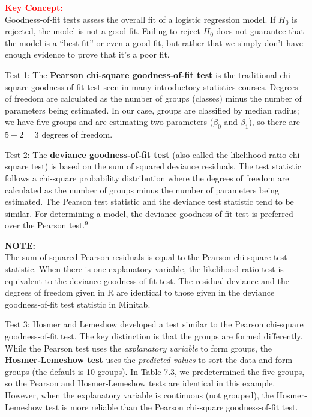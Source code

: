 \documentclass[
]{report}
\begin{document}
\large

\textbf{\textcolor{red}{Key Concept:}}\\
\color{red}
Goodness‐of‐fit tests assess the overall fit of a logistic regression model. If \(H_0\) is rejected, the model is not a good fit. Failing to reject \(H_0\) does not guarantee that the model is a ``best fit'' or even a good fit, but rather that we simply don't have enough evidence to prove that it's a poor fit.\\
\color{black}
\normalsize

Test 1: The \textbf{Pearson chi‐square goodness‐of‐fit test} is the traditional chi‐square goodness‐of‐fit test seen in many introductory statistics courses. Degrees of freedom are calculated as the number of groups (classes) minus the number of parameters being estimated. In our case, groups are classified by median radius; we have five groups and are estimating two parameters (\(\beta_0\) and \(\beta_1\)), so there are \(5 - 2 = 3\) degrees of freedom.

Test 2: The \textbf{deviance goodness‐of‐fit test} (also called the likelihood ratio chi‐square test) is based on the sum of squared deviance residuals. The test statistic follows a chi‐square probability distribution where the degrees of freedom are calculated as the number of groups minus the number of parameters being estimated. The Pearson test statistic and the deviance test statistic tend to be similar. For determining a model, the deviance goodness‐of‐fit test is preferred over the Pearson test.\(^9\)

\large

\textbf{NOTE:}\\
The sum of squared Pearson residuals is equal to the Pearson chi‐square test statistic. When there is one explanatory variable, the likelihood ratio test is equivalent to the deviance goodness‐of‐fit test. The residual deviance and the degrees of freedom given in R are identical to those given in the deviance goodness‐of‐fit test statistic in Minitab.\\
\normalsize

Test 3: Hosmer and Lemeshow developed a test similar to the Pearson chi‐square goodness‐of‐fit test. The key distinction is that the groups are formed differently. While the Pearson test uses the \emph{explanatory variable} to form groups, the \textbf{Hosmer‐Lemeshow test} uses the \emph{predicted values} to sort the data and form groups (the default is 10 groups). In Table 7.3, we predetermined the five groups, so the Pearson and Hosmer‐Lemeshow tests are identical in this example. However, when the explanatory variable is continuous (not grouped), the Hosmer‐Lemeshow test is more reliable than the Pearson chi‐square goodness‐of‐fit test.
\end{document}
